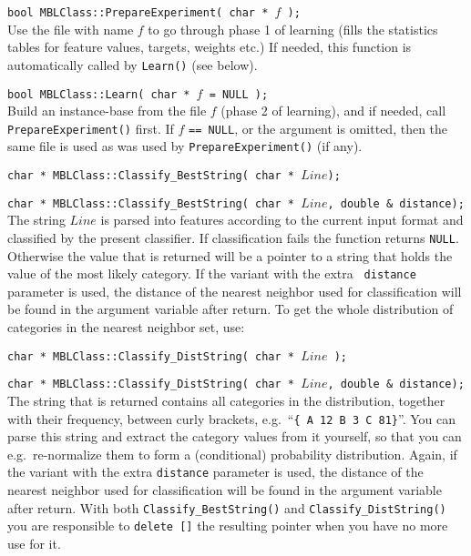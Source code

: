 \documentclass{report}
\begin{document}
\begin{description}

\item {\tt bool MBLClass::PrepareExperiment( char * $f$ );}\\ 
Use the file with name $f$ to go through phase 1 of learning (fills
the statistics tables for feature values, targets, weights etc.)  If
needed, this function is automatically called by {\tt Learn()} (see
below).

\item {\tt bool MBLClass::Learn( char * $f$ = NULL );}\\ 
Build an instance-base from the file $f$ (phase 2 of learning), and if
needed, call {\tt PrepareExperiment()} first. If $f$ {\tt == NULL}, or
the argument is omitted, then the same file is used as was used by
{\tt PrepareExperiment()} (if any).


\item {\tt char * MBLClass::Classify\_BestString( char * $Line$);}
\item {\tt char * MBLClass::Classify\_BestString( char * $Line$, double \& distance);}\\
The string $Line$ is parsed into features according to the current
input format and classified by the present classifier. If
classification fails the function returns {\tt NULL}. Otherwise the
value that is returned will be a pointer to a string that holds the
value of the most likely category. If the variant with the extra {\tt
distance} parameter is used, the distance of the nearest neighbor used
for classification will be found in the argument variable after return.
To get the whole distribution of categories in the nearest neighbor
set, use:
\item {\tt char * MBLClass::Classify\_DistString( char * $Line$ );}
\item {\tt char * MBLClass::Classify\_DistString( char * $Line$,
double \& distance);}\\
The string that is returned contains all categories in the
distribution, together with their frequency, between curly brackets, 
e.g.~``{\tt\{ A 12 B 3 C
81\}}''. You can parse this string and extract the category values from
it yourself, so that you can e.g.~re-normalize them to form a
(conditional) probability distribution. Again, if the variant with the
extra {\tt distance} parameter is used, the distance of the nearest
neighbor used for classification will be found in the argument
variable after return.
\noindent
With both {\tt Classify\_BestString()} and {\tt Classify\_DistString()}
you are responsible to {\tt delete []} the resulting pointer when you
have no more use for it.


\end{description}
\end{document}

